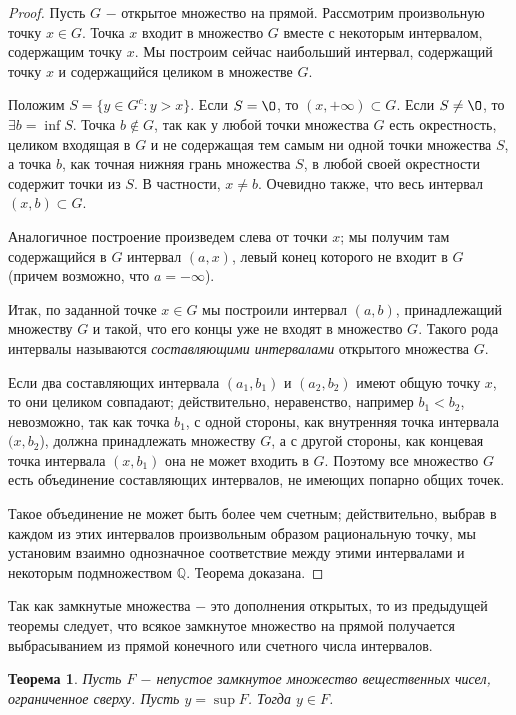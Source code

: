 \documentclass{article}
\newtheorem{theorem}{Теорема}[section]
\begin{document}
\begin{proof}
Пусть \(G\) \(-\) открытое множество на прямой. Рассмотрим произвольную точку \(x \in G\). Точка \(x\) входит в множество \(G\) вместе с некоторым интервалом, содержащим точку \(x\). Мы построим сейчас наибольший интервал, содержащий точку \(x\) и содержащийся целиком в множестве \(G\).

Положим \(S = \{y \in G^c : y > x\}\). Если \(S = \O\), то \((x, + \infty) \subset G\). Если \(S \neq \O\), то \(\exists b = \inf S\). Точка \(b \notin G\), так как у любой точки множества \(G\) есть окрестность, целиком входящая в \(G\) и не содержащая тем самым ни одной точки множества \(S\), а точка \(b\), как точная нижняя грань множества \(S\), в любой своей окрестности содержит точки из \(S\). В частности, \(x \neq b\). Очевидно также, что весь интервал \((x, b) \subset G\).

Аналогичное построение произведем слева от точки \(x\); мы получим там содержащийся в \(G\) интервал \((a, x)\), левый конец которого не входит в \(G\) (причем возможно, что \(a = - \infty\)).

Итак, по заданной точке \(x \in G\) мы построили интервал \((a, b)\), принадлежащий множеству \(G\) и такой, что его концы уже не входят в множество \(G\). Такого рода интервалы называются \textit{составляющими интервалами} открытого множества \(G\).

Если два составляющих интервала \((a_1, b_1)\) и \((a_2, b_2)\) имеют общую точку \(x\), то они целиком совпадают; действительно, неравенство, например \(b_1 < b_2\), невозможно, так как точка \(b_1\), с одной стороны, как внутренняя точка интервала \((x, b_2\)), должна принадлежать множеству \(G\), а с другой стороны, как концевая точка интервала \((x, b_1)\) она не может входить в \(G\). Поэтому все множество \(G\) есть объединение составляющих интервалов, не имеющих попарно общих точек.

Такое объединение не может быть более чем счетным; действительно, выбрав в каждом из этих интервалов произвольным образом рациональную точку, мы установим взаимно однозначное соответствие между этими интервалами и некоторым подмножеством \(\mathbb{Q}\). Теорема доказана.
\end{proof}

Так как замкнутые множества \(-\) это дополнения открытых, то из предыдущей теоремы следует, что всякое замкнутое множество на прямой получается выбрасыванием из прямой конечного или счетного числа интервалов.

\begin{theorem}
Пусть \(F\) \(-\) непустое замкнутое множество вещественных чисел, ограниченное сверху. Пусть \(y = \sup F\). Тогда \(y \in F\).
\end{theorem}
\end{document}
